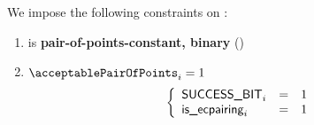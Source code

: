 We impose the following constraints on \acceptablePairOfPoints{}:
\begin{enumerate}
    \item \acceptablePairOfPoints{} is \textbf{pair-of-points-constant, binary} \quad (\trash)
    \item \If $\acceptablePairOfPoints_{i} = 1$ \Then
        \[
            \left\{ \begin{array}{lcl}
                \textsf{SUCCESS\_BIT} _{i} & = & 1 \\
                \textsf{is\_ecpairing}   _{i} & = & 1 \\
            \end{array} \right.
        \]
\end{enumerate}
